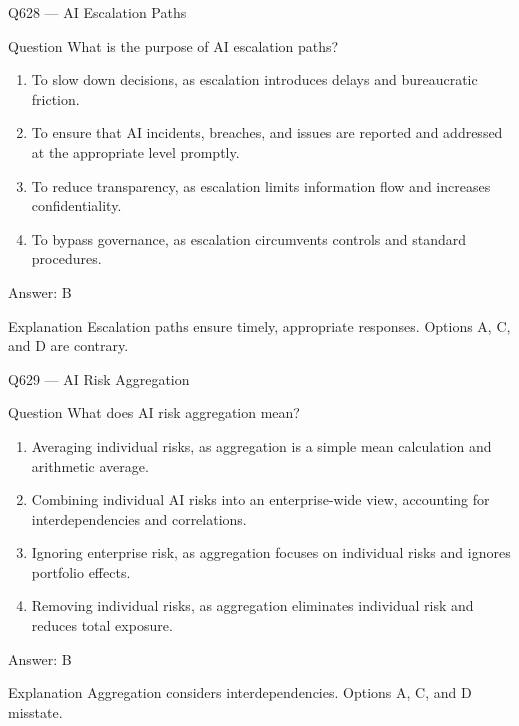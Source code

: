 \documentclass[aspectratio=169,8pt]{beamer}
\begin{document}
	\begin{frame}{Q628 --- AI Escalation Paths}
		\begin{block}{Question}
			What is the purpose of AI escalation paths?
			\begin{enumerate}
				\item To slow down decisions, as escalation introduces delays and bureaucratic friction.
				\item To ensure that AI incidents, breaches, and issues are reported and addressed at the appropriate level promptly.
				\item To reduce transparency, as escalation limits information flow and increases confidentiality.
				\item To bypass governance, as escalation circumvents controls and standard procedures.
			\end{enumerate}
		\end{block}
		\begin{exampleblock}{Answer: B}\end{exampleblock}
		\begin{block}{Explanation}
			Escalation paths ensure timely, appropriate responses. Options A, C, and D are contrary.
		\end{block}
	\end{frame}
	
	\begin{frame}{Q629 --- AI Risk Aggregation}
		\begin{block}{Question}
			What does AI risk aggregation mean?
			\begin{enumerate}
				\item Averaging individual risks, as aggregation is a simple mean calculation and arithmetic average.
				\item Combining individual AI risks into an enterprise-wide view, accounting for interdependencies and correlations.
				\item Ignoring enterprise risk, as aggregation focuses on individual risks and ignores portfolio effects.
				\item Removing individual risks, as aggregation eliminates individual risk and reduces total exposure.
			\end{enumerate}
		\end{block}
		\begin{exampleblock}{Answer: B}\end{exampleblock}
		\begin{block}{Explanation}
			Aggregation considers interdependencies. Options A, C, and D misstate.
		\end{block}
	\end{frame}
	
\end{document}
